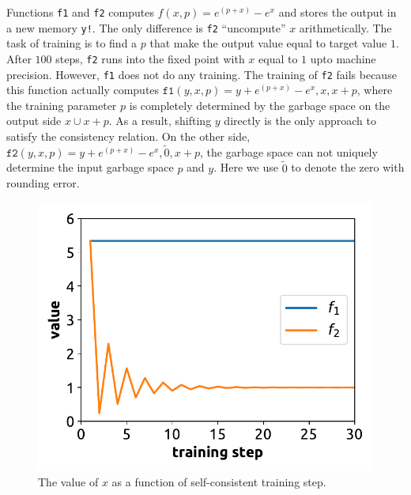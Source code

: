 \documentclass[aps,twocolumn,longbibliography,english,superscriptaddress]{revtex4-1}
\newcommand{\<}{\langle}
\renewcommand{\>}{\rangle}
\theoremstyle{definition}\newtheorem{definition}{\textit{Definition}}
\begin{document}
Functions \texttt{f1} and \texttt{f2} computes $f(x, p) = e^{(p+x)} - e^x$ and stores the output in a new memory \texttt{y!}.
The only difference is \texttt{f2} ``uncompute'' $x$ arithmetically.
The task of training is to find a $p$ that make the output value equal to target value $1$.
After $100$ steps, \texttt{f2} runs into the fixed point with $x$ equal to $1$ upto machine precision.
However, \texttt{f1} does not do any training.
The training of \texttt{f2} fails because this function actually computes $\texttt{f1}(y, x, p) = y + e^{(p+x)} - e^{x}, x, x+p$, where the training parameter $p$ is completely determined by the garbage space on the output side $x \cup x+p$. As a result, shifting $y$ directly is the only approach to satisfy the consistency relation. On the other side, $\texttt{f2}(y, x, p) = y + e^{(p+x)} - e^x, \tilde{0}, x+p$, the garbage space can not uniquely determine the input garbage space $p$ and $y$. Here we use $\tilde{0}$ to denote the zero with rounding error.

\begin{figure}
    \centerline{\includegraphics[width=0.9\columnwidth,trim={0 0.3cm 0 0},clip]{images/fig1.pdf}}
    \caption{The value of $x$ as a function of self-consistent training step.}\label{fig:invtrain}
\end{figure}
\end{document}
